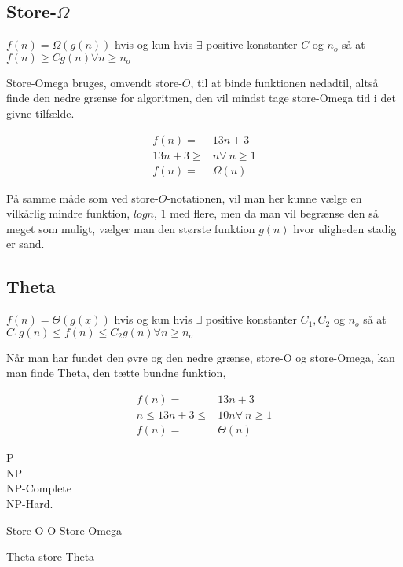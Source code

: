 \subsection{Store-$\Omega$}
\begin{defn}
$f(n) = \Omega(g(n))$ hvis og kun hvis $\exists$ positive konstanter $C$ og $n_o$ så at $f(n) \geq C g(n) \forall n \geq n_o$
\end{defn}
Store-Omega bruges, omvendt store-$O$, til at binde funktionen nedadtil, altså finde den nedre grænse for algoritmen, den vil mindst tage store-Omega tid i det givne tilfælde.
\begin{exmp}
\begin{align*}
f(n)=& 13n+3 \\
13n+3 \geq& n \forall \ n \geq 1 \\
f(n) =& \Omega(n)
\end{align*}
\end{exmp}

På samme måde som ved store-$O$-notationen, vil man her kunne vælge en vilkårlig mindre funktion, $logn$, $1$ med flere, men da man vil begrænse den så meget som muligt, vælger man den største funktion $g(n)$ hvor uligheden stadig er sand.
\subsection{Theta}
\begin{defn}
$f(n) = \Theta(g(x))$ hvis og kun hvis $\exists$ positive konstanter $C_1, C_2$ og $n_o$ så at $C_1g(n) \leq f(n) \leq C_2g(n) \forall n \geq n_o$
\end{defn}
Når man har fundet den øvre og den nedre grænse, store-O og store-Omega, kan man finde Theta, den tætte bundne funktion,
\begin{exmp}
\begin{align*}
f(n)=& 13n+3 \\
n \leq 13n+3 \leq& 10n \forall \ n \geq 1 \\
f(n) =& \Theta(n)
\end{align*}
\end{exmp}
P \\
NP \\
NP-Complete \\
NP-Hard. 

Store-O
O
Store-Omega

Theta
store-Theta
